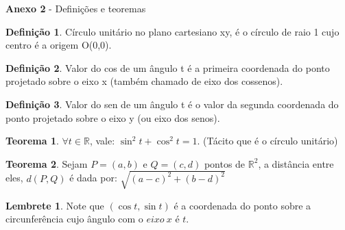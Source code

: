\documentclass[english,ngerman,parskip=half]{scrartcl}
\theoremstyle{definition}
\newtheorem{definition}{Definição}
\newtheorem{theorem}{Teorema}
\newtheorem*{remark}{Lembrete}
\begin{document}
\textbf{Anexo 2} - Definições e teoremas
\begin{definition}{Círculo unitário}
       no plano cartesiano xy, é o círculo de raio 1 cujo centro é a origem O(0,0).
\end{definition}
\begin{definition}{Valor do cos de um ângulo t}
        é a primeira coordenada do ponto projetado sobre o eixo x (também chamado de eixo dos cossenos).
\end{definition}
\begin{definition}{Valor do sen de um ângulo t}
    é o valor da segunda coordenada do ponto projetado sobre o eixo y (ou eixo dos senos).
\end{definition}
\begin{theorem}
    $\forall t \in \mathbb{R}$, vale: $\sin^2t + \cos^2t = 1$. (Tácito que é o círculo unitário)
\end{theorem}
\begin{theorem}
    Sejam $P=(a,b)$ e $Q=(c,d)$ pontos de $\mathbb{R}^2$, a distância entre eles, $d(P,Q)$ é dada por: 
    $\sqrt{(a-c)^2 + (b-d)^2}$
\end{theorem}
\begin{remark}
       Note que $(\cos t, \sin t)$ é a coordenada do ponto sobre a circunferência cujo ângulo com o $eixo\ x$ é $t$.
\end{remark}
\end{document}
